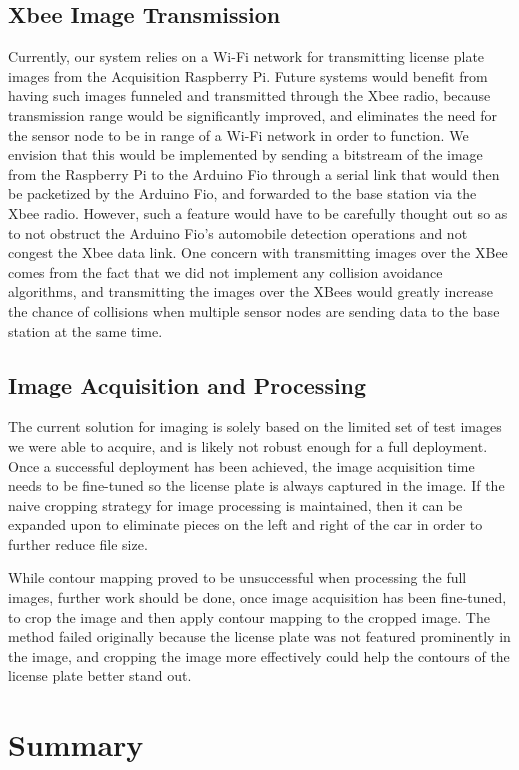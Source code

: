 \documentclass[11pt, oneside, fullpage, doublespace]{article}
\begin{document}
\subsection{Xbee Image Transmission}
Currently, our system relies on a Wi-Fi network for transmitting license plate images from the Acquisition Raspberry Pi. Future systems would benefit from having such images funneled and transmitted through the Xbee radio, because transmission range would be significantly improved, and eliminates the need for the sensor node to be in range of a Wi-Fi network in order to function. We envision that this would be implemented by sending a bitstream of the image from the Raspberry Pi to the Arduino Fio through a serial link that would then be packetized by the Arduino Fio, and forwarded to the base station via the Xbee radio. However, such a feature would have to be carefully thought out so as to not obstruct the Arduino Fio's automobile detection operations and not congest the Xbee data link. One concern with transmitting images over the XBee comes from the fact that we did not implement any collision avoidance algorithms, and transmitting the images over the XBees would greatly increase the chance of collisions when multiple sensor nodes are sending data to the base station at the same time.

\subsection{Image Acquisition and Processing}
The current solution for imaging is solely based on the limited set of test images we were able to acquire, and is likely not robust enough for a full deployment. Once a successful deployment has been achieved, the image acquisition time needs to be fine-tuned so the license plate is always captured in the image. If the naive cropping strategy for image processing is maintained, then it can be expanded upon to eliminate pieces on the left and right of the car in order to further reduce file size.

While contour mapping proved to be unsuccessful when processing the full images, further work should be done, once image acquisition has been fine-tuned, to crop the image and then apply contour mapping to the cropped image. The method failed originally because the license plate was not featured prominently in the image, and cropping the image more effectively could help the contours of the license plate better stand out.

\section{Summary}
\end{document}
